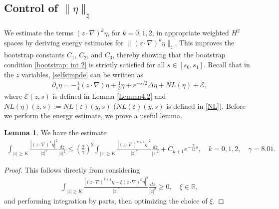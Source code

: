 \documentclass[11pt,reqno]{amsart}
\theoremstyle{definition}
\theoremstyle{bfremark}
\newtheorem{lemma}{Lemma}[section]
\numberwithin{equation}{section}
\begin{document}
\subsection{Control of \(\|\eta\|_{\natural}\)}
We estimate the terms \((z \cdot \nabla)^k \eta\), for \(k = 0, 1, 2\), in appropriate weighted \(H^2\) spaces by deriving energy estimates for \(\|(z \cdot \nabla)^k \eta\|_{\natural}\). This improves the bootstrap constants \(C_1\), \(C_2\), and \(C_3\), thereby showing that the bootstrap condition \ref{bootstrap: int 2} is strictly satisfied for all \(s \in [s_0, s_1]\). Recall that in the \(z\) variables, \ref{selfsimpde} can be written as
\begin{align}
    \partial_s \eta=-\frac{1}{4}(z \cdot \nabla) \eta+\frac{1}{3}\eta+e^{-s/2}\Delta \eta+NL(\eta)+\mathcal{E},
\end{align}
where \(\mathcal{E}(z,s)\) is defined in Lemma \ref{Lemma4.2} and \(NL(\eta)(z,s):=NL(\varepsilon)(y,s)\) (\(NL(\varepsilon)(y,s)\) is defined in \ref{NL}). Before we perform the energy estimate, we prove a useful lemma.
\begin{lemma}
\label{lem:sobolev type}
    We have the estimate
    \begin{align*}
        \int_{|z| \geq K}\frac{|(z \cdot \nabla)^k \eta|^2}{|z|^{\gamma}}\frac{dz}{|z|^2}\leq \left(\frac{2}{\gamma}\right)^2 \int_{|z| \geq K}\frac{|(z \cdot \nabla)^{k+1} \eta|^2}{|z|^{\gamma}}\frac{dz}{|z|^2}+C_{k+1}e^{-\frac{5}{12}s}, \quad k=0,1,2, \quad \gamma=8.01.
    \end{align*}
\end{lemma}
\begin{proof}
    This follows directly from considering 
    \begin{align*}
        \int_{|z| \geq K}\frac{|(z \cdot \nabla)^{k+1} \eta-\xi(z \cdot \nabla)^{k} \eta|^2}{|z|^{\gamma}}\frac{dz}{|z|^2} \geq 0, \quad \xi \in \mathbb{R},
    \end{align*}
    and performing integration by parts, then optimizing the choice of $\xi$.
\end{proof}
\end{document}
